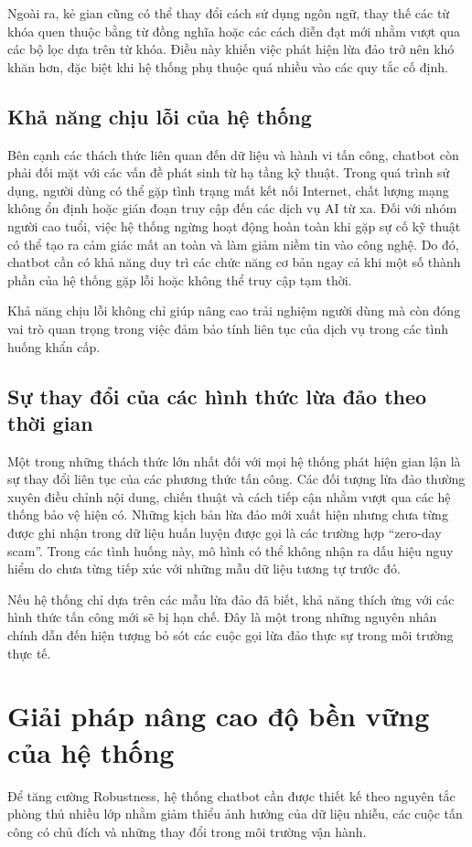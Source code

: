 Ngoài ra, kẻ gian cũng có thể thay đổi cách sử dụng ngôn ngữ, thay thế các từ khóa quen thuộc bằng từ đồng nghĩa hoặc các cách diễn đạt mới nhằm vượt qua các bộ lọc dựa trên từ khóa. Điều này khiến việc phát hiện lừa đảo trở nên khó khăn hơn, đặc biệt khi hệ thống phụ thuộc quá nhiều vào các quy tắc cố định.

\subsection{Khả năng chịu lỗi của hệ thống}
Bên cạnh các thách thức liên quan đến dữ liệu và hành vi tấn công, chatbot còn phải đối mặt với các vấn đề phát sinh từ hạ tầng kỹ thuật. Trong quá trình sử dụng, người dùng có thể gặp tình trạng mất kết nối Internet, chất lượng mạng không ổn định hoặc gián đoạn truy cập đến các dịch vụ AI từ xa.
Đối với nhóm người cao tuổi, việc hệ thống ngừng hoạt động hoàn toàn khi gặp sự cố kỹ thuật có thể tạo ra cảm giác mất an toàn và làm giảm niềm tin vào công nghệ. Do đó, chatbot cần có khả năng duy trì các chức năng cơ bản ngay cả khi một số thành phần của hệ thống gặp lỗi hoặc không thể truy cập tạm thời.

Khả năng chịu lỗi không chỉ giúp nâng cao trải nghiệm người dùng mà còn đóng vai trò quan trọng trong việc đảm bảo tính liên tục của dịch vụ trong các tình huống khẩn cấp.

\subsection{Sự thay đổi của các hình thức lừa đảo theo thời gian}
Một trong những thách thức lớn nhất đối với mọi hệ thống phát hiện gian lận là sự thay đổi liên tục của các phương thức tấn công. Các đối tượng lừa đảo thường xuyên điều chỉnh nội dung, chiến thuật và cách tiếp cận nhằm vượt qua các hệ thống bảo vệ hiện có.
Những kịch bản lừa đảo mới xuất hiện nhưng chưa từng được ghi nhận trong dữ liệu huấn luyện được gọi là các trường hợp “zero-day scam”. Trong các tình huống này, mô hình có thể không nhận ra dấu hiệu nguy hiểm do chưa từng tiếp xúc với những mẫu dữ liệu tương tự trước đó.

Nếu hệ thống chỉ dựa trên các mẫu lừa đảo đã biết, khả năng thích ứng với các hình thức tấn công mới sẽ bị hạn chế. Đây là một trong những nguyên nhân chính dẫn đến hiện tượng bỏ sót các cuộc gọi lừa đảo thực sự trong môi trường thực tế.

\section{Giải pháp nâng cao độ bền vững của hệ thống}
Để tăng cường Robustness, hệ thống chatbot cần được thiết kế theo nguyên tắc phòng thủ nhiều lớp nhằm giảm thiểu ảnh hưởng của dữ liệu nhiễu, các cuộc tấn công có chủ đích và những thay đổi trong môi trường vận hành.

